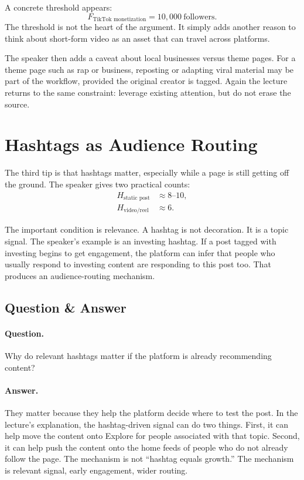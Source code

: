 A concrete threshold appears:
\begin{equation}
F_{\text{TikTok monetization}}
=
10{,}000\ \text{followers}.
\end{equation}
The threshold is not the heart of the argument. It simply adds another reason to think about short-form video as an asset that can travel across platforms.

The speaker then adds a caveat about local businesses versus theme pages. For a theme page such as rap or business, reposting or adapting viral material may be part of the workflow, provided the original creator is tagged. Again the lecture returns to the same constraint: leverage existing attention, but do not erase the source.

\section{Hashtags as Audience Routing}

The third tip is that hashtags matter, especially while a page is still getting off the ground. The speaker gives two practical counts:
\begin{align}
H_{\text{static post}} &\approx 8\text{--}10,\\
H_{\text{video/reel}} &\approx 6.
\end{align}

The important condition is relevance. A hashtag is not decoration. It is a topic signal. The speaker's example is an investing hashtag. If a post tagged with investing begins to get engagement, the platform can infer that people who usually respond to investing content are responding to this post too. That produces an audience-routing mechanism.

\subsection{Question \& Answer}

\paragraph{Question.}
Why do relevant hashtags matter if the platform is already recommending content?

\paragraph{Answer.}
They matter because they help the platform decide where to test the post. In the lecture's explanation, the hashtag-driven signal can do two things. First, it can help move the content onto Explore for people associated with that topic. Second, it can help push the content onto the home feeds of people who do not already follow the page. The mechanism is not ``hashtag equals growth.'' The mechanism is relevant signal, early engagement, wider routing.

